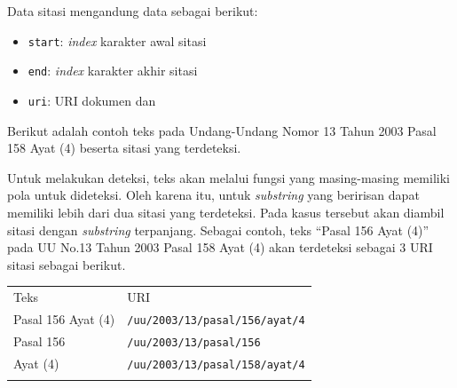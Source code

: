 Data sitasi mengandung data sebagai berikut:

\begin{itemize}
\itemsep1pt\parskip0pt
\item
  \texttt{start}: \emph{index} karakter awal sitasi
\item
  \texttt{end}: \emph{index} karakter akhir sitasi
\item
  \texttt{uri}: URI dokumen dan
\end{itemize}

Berikut adalah contoh teks pada Undang-Undang Nomor 13 Tahun 2003 Pasal
158 Ayat (4) beserta sitasi yang terdeteksi.

\begin{Shaded}
\begin{Highlighting}[]
 \NormalTok{>-}
  \KeywordTok{-}  
     
     
  \KeywordTok{-}  
     
     
\end{Highlighting}
\end{Shaded}

Untuk melakukan deteksi, teks akan melalui fungsi yang masing-masing
memiliki pola untuk dideteksi. Oleh karena itu, untuk \emph{substring}
yang beririsan dapat memiliki lebih dari dua sitasi yang terdeteksi.
Pada kasus tersebut akan diambil sitasi dengan \emph{substring}
terpanjang. Sebagai contoh, teks ``Pasal 156 Ayat (4)'' pada UU No.13
Tahun 2003 Pasal 158 Ayat (4) akan terdeteksi sebagai 3 URI sitasi
sebagai berikut.

\begin{longtable}[c]{@{}ll@{}}
\toprule\addlinespace
Teks & URI
\\\addlinespace
\midrule\endhead
Pasal 156 Ayat (4) & \texttt{/uu/2003/13/pasal/156/ayat/4}
\\\addlinespace
Pasal 156 & \texttt{/uu/2003/13/pasal/156}
\\\addlinespace
Ayat (4) & \texttt{/uu/2003/13/pasal/158/ayat/4}
\\\addlinespace
\bottomrule
\end{longtable}

